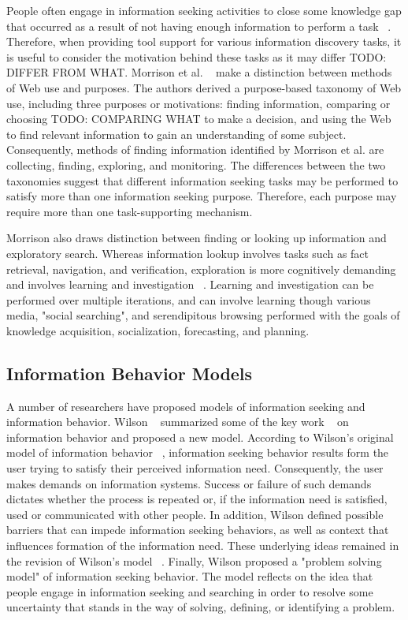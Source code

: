 \documentclass{casconpaper}
\begin{document}
{{People often engage in information seeking activities to close some knowledge gap that occurred as a result of not having enough information to perform a task ~\cite{proper}. Therefore, when providing tool support for various information discovery tasks, it is useful to consider the motivation behind these tasks as it may differ TODO: DIFFER FROM WHAT. Morrison et al. ~\cite{morrison} make a distinction between methods of Web use and purposes. The authors derived a purpose-based taxonomy of Web use, including three purposes or motivations: finding information, comparing or choosing TODO: COMPARING WHAT to make a decision, and using the Web to find relevant information to gain an understanding of some subject. Consequently, methods of finding information identified by Morrison et al. are collecting, finding, exploring, and monitoring. The differences between the two taxonomies suggest that different information seeking tasks may be performed to satisfy more than one information seeking purpose. Therefore, each purpose may require more than one task-supporting mechanism. 

Morrison also draws distinction between finding or looking up information and exploratory search. Whereas information lookup involves tasks such as fact retrieval, navigation, and verification, exploration is more cognitively demanding and involves learning and investigation ~\cite{marchionini}. Learning and investigation can be performed over multiple iterations, and can involve learning though various media, "social searching", and serendipitous browsing performed with the goals of knowledge acquisition, socialization, forecasting, and planning. 

} %

{\subsection{Information Behavior Models}

A number of researchers have proposed models of information seeking and information behavior. Wilson ~\cite{wilson1999} summarized some of the key work ~\cite{ellis1989, dervin, kuhlthau, wilson1997, wilson1981} on information behavior and proposed a new model. According to Wilson's original model of information behavior ~\cite{wilson1981}, information seeking behavior results form the user trying to satisfy their perceived information need. Consequently, the user makes demands on information systems. Success or failure of such demands dictates whether the process is repeated or, if the information need is satisfied, used or communicated with other people. In addition, Wilson defined possible barriers that can impede information seeking behaviors, as well as context that influences formation of the information need. These underlying ideas remained in the revision of Wilson's model ~\cite{wilson1997}. Finally, Wilson proposed a "problem solving model" of information seeking behavior. The model reflects on the idea that people engage in information seeking and searching in order to resolve some uncertainty that stands in the way of solving, defining, or identifying a problem.  

}}
\end{document}
